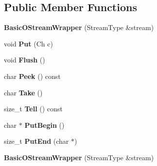 \subsection*{Public Member Functions}
\begin{DoxyCompactItemize}
\item 
{\bfseries Basic\+O\+Stream\+Wrapper} (Stream\+Type \&stream)\hypertarget{class_basic_o_stream_wrapper_a067a516c13b7c9d4dacef598d32779ef}{}\label{class_basic_o_stream_wrapper_a067a516c13b7c9d4dacef598d32779ef}

\item 
void {\bfseries Put} (Ch c)\hypertarget{class_basic_o_stream_wrapper_a7d3ba9d651fbe27fe05387f512154ea8}{}\label{class_basic_o_stream_wrapper_a7d3ba9d651fbe27fe05387f512154ea8}

\item 
void {\bfseries Flush} ()\hypertarget{class_basic_o_stream_wrapper_a1c48a8b7520b0ab6ca34e665b928b56d}{}\label{class_basic_o_stream_wrapper_a1c48a8b7520b0ab6ca34e665b928b56d}

\item 
char {\bfseries Peek} () const \hypertarget{class_basic_o_stream_wrapper_a81eda65252d99c350d754bb702526dae}{}\label{class_basic_o_stream_wrapper_a81eda65252d99c350d754bb702526dae}

\item 
char {\bfseries Take} ()\hypertarget{class_basic_o_stream_wrapper_a54be63e8d24f4d82329b860a907f65fe}{}\label{class_basic_o_stream_wrapper_a54be63e8d24f4d82329b860a907f65fe}

\item 
size\+\_\+t {\bfseries Tell} () const \hypertarget{class_basic_o_stream_wrapper_ab5f119855c8591b650fbcbeb99be677e}{}\label{class_basic_o_stream_wrapper_ab5f119855c8591b650fbcbeb99be677e}

\item 
char $\ast$ {\bfseries Put\+Begin} ()\hypertarget{class_basic_o_stream_wrapper_a564b7b727bdab12185e7a7bd1ac5e822}{}\label{class_basic_o_stream_wrapper_a564b7b727bdab12185e7a7bd1ac5e822}

\item 
size\+\_\+t {\bfseries Put\+End} (char $\ast$)\hypertarget{class_basic_o_stream_wrapper_a1da108e43a5a517c4484821fced1fca0}{}\label{class_basic_o_stream_wrapper_a1da108e43a5a517c4484821fced1fca0}

\item 
{\bfseries Basic\+O\+Stream\+Wrapper} (Stream\+Type \&stream)\hypertarget{class_basic_o_stream_wrapper_a067a516c13b7c9d4dacef598d32779ef}{}\label{class_basic_o_stream_wrapper_a067a516c13b7c9d4dacef598d32779ef}


\end{DoxyCompactItemize}
